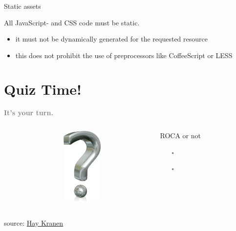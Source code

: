 \documentclass{beamer}
\newcommand{\rocaok}{\ding{51}}
\newcommand{\rocafail}{\ding{55}}
\begin{document}
\begin{frame}{Static assets}

  All JavaScript- and CSS code must be static.

  \begin{itemize}
    \item it must not be dynamically generated for the requested resource
    \item this does not prohibit the use of preprocessors like CoffeeScript or LESS
  \end{itemize}
\end{frame}

\section{Quiz Time!}

\begin{frame}
  \vspace*{-1cm}
  \textcolor{gray}{
    \begin{center}
      \textbf{
        \fontsize{50}{50}\selectfont It's your turn.
      }
    \end{center}
  }
\end{frame}

\begin{frame}{\insertsectionhead}
  \vspace*{0.5in}

  \begin{columns}
    \begin{column}{2.2cm}
    \end{column}

    \begin{column}{2.2cm}
      \includegraphics[width=2cm]{images/quiz.png}
    \end{column}

    \begin{column}{6.6cm}
      ROCA or not
      \vspace{0.3cm}
      \begin{itemize}
        \item[$\square$] \rocaok
        \item[$\square$] \rocafail
      \end{itemize}
    \end{column}
  \end{columns}

  \vspace*{0.4in}
  \tiny source: \href{http://commons.wikimedia.org/wiki/File:Question_mark_3d.png}{Hay Kranen}
\end{frame}
\end{document}

